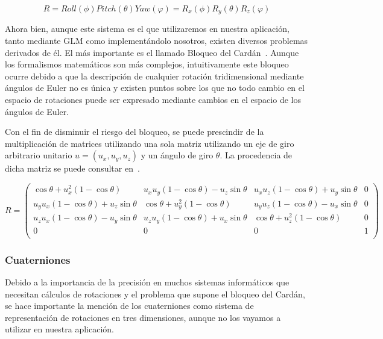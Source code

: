 \begin{equation}
		R = Roll(\phi)Pitch(\theta)Yaw(\varphi) = R_x(\phi)R_y(\theta)R_z(\varphi)	
\end{equation}

Ahora bien, aunque este sistema es el que utilizaremos en nuestra aplicación,
tanto mediante GLM como implementándolo nosotros, existen diversos problemas
derivados de él. El más importante es el llamado Bloqueo del
Cardán~\cite{Vince:2011:QCG:2016678}. Aunque los formalismos matemáticos son más
complejos, intuitivamente este bloqueo ocurre debido a que la descripción de
cualquier rotación tridimensional mediante ángulos de Euler no es única y
existen puntos sobre los que no todo cambio en el espacio de rotaciones puede
ser expresado mediante cambios en el espacio de los ángulos de Euler. 

Con el fin de disminuir el riesgo del bloqueo, se puede prescindir de la
multiplicación de matrices utilizando una sola matriz utilizando un eje de giro
arbitrario unitario $u = (u_x, u_y, u_z)$ y un ángulo de giro $\theta$. La
procedencia de dicha matriz se puede consultar en~\citet{Rodrigues}. 

\begin{equation}
		R = 
		\left(
				\begin{array}{cccc}
						\cos\theta + u_x^2(1-\cos\theta) &
						u_xu_y(1-\cos\theta)-u_z\sin\theta &
						u_xu_z(1-\cos\theta)+u_y\sin\theta & 0 \\

						u_yu_x(1-\cos\theta)+u_z\sin\theta & \cos\theta +
						u_y^2(1-\cos\theta) &
						u_yu_z(1-\cos\theta)-u_x\sin\theta & 0 \\

						u_zu_x(1-\cos\theta)-u_y\sin\theta &
						u_zu_y(1-\cos\theta) + u_x\sin\theta & \cos\theta +
						u_z^2(1-\cos\theta) & 0 \\

						0 & 0 & 0 & 1 \\
				\end{array}
		\right)
\end{equation}

\subsubsection{Cuaterniones}
\label{makereference5.4.2.2}

Debido a la importancia de la precisión en muchos sistemas informáticos que
necesitan cálculos de rotaciones y el problema que supone el bloqueo del Cardán,
se hace importante la mención de los cuaterniones como sistema de representación
de rotaciones en tres dimensiones, aunque no los vayamos a utilizar en nuestra
aplicación. 

